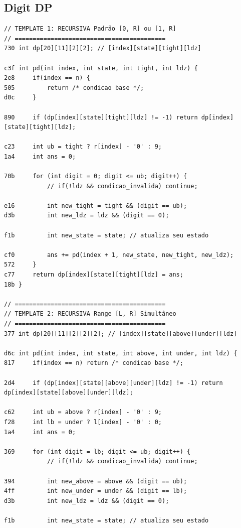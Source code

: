 \documentclass[11pt, a4paper, twoside]{article}
\begin{document}
{\subsection{Digit DP}
\begin{lstlisting}
// TEMPLATE 1: RECURSIVA Padrão [0, R] ou [1, R]
// ==========================================
730 int dp[20][11][2][2]; // [index][state][tight][ldz]

c3f int pd(int index, int state, int tight, int ldz) {
2e8     if(index == n) {
505         return /* condicao base */;
d0c     }
        
890     if (dp[index][state][tight][ldz] != -1) return dp[index][state][tight][ldz];
    
c23     int ub = tight ? r[index] - '0' : 9;
1a4     int ans = 0;
    
70b     for (int digit = 0; digit <= ub; digit++) {
            // if(!ldz && condicao_invalida) continue;
    
e16         int new_tight = tight && (digit == ub);
d3b         int new_ldz = ldz && (digit == 0);
            
f1b         int new_state = state; // atualiza seu estado
    
cf0         ans += pd(index + 1, new_state, new_tight, new_ldz);
572     }
c77     return dp[index][state][tight][ldz] = ans; 
18b }

// ==========================================
// TEMPLATE 2: RECURSIVA Range [L, R] Simultâneo
// ==========================================
377 int dp[20][11][2][2][2]; // [index][state][above][under][ldz]

d6c int pd(int index, int state, int above, int under, int ldz) {
817     if(index == n) return /* condicao base */;
    
2d4     if (dp[index][state][above][under][ldz] != -1) return dp[index][state][above][under][ldz];
    
c62     int ub = above ? r[index] - '0' : 9;
f28     int lb = under ? l[index] - '0' : 0;
1a4     int ans = 0;
    
369     for (int digit = lb; digit <= ub; digit++) {
            // if(!ldz && condicao_invalida) continue;
    
394         int new_above = above && (digit == ub);
4ff         int new_under = under && (digit == lb);
d3b         int new_ldz = ldz && (digit == 0);
            
f1b         int new_state = state; // atualiza seu estado
    

\end{lstlisting}}
\end{document}
